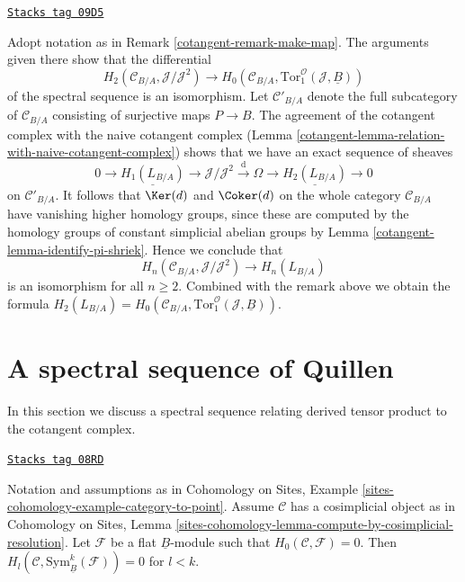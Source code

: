\begin{remark}[Surjection]
\label{cotangent-remark-surjection}
\href{https://stacks.math.columbia.edu/tag/09D5}{\texttt{Stacks tag 09D5}}

Adopt notation as in Remark \ref{cotangent-remark-make-map}. The arguments given
there show that the differential
$$
H_2(\mathcal{C}_{B/A}, \mathcal{J}/\mathcal{J}^2)
\longrightarrow
H_0(\mathcal{C}_{B/A}, \text{Tor}_1^\mathcal{O}(\mathcal{J}, \underline{B}))
$$
of the spectral sequence is an isomorphism. Let $\mathcal{C}'_{B/A}$
denote the full subcategory of $\mathcal{C}_{B/A}$ consisting of surjective
maps $P \to B$. The agreement of the cotangent complex with the naive
cotangent complex (Lemma \ref{cotangent-lemma-relation-with-naive-cotangent-complex})
shows that we have an exact sequence of sheaves
$$
0 \to \underline{H_1(L_{B/A})} \to
\mathcal{J}/\mathcal{J}^2 \xrightarrow{\text{d}} \Omega \to
\underline{H_2(L_{B/A})} \to 0
$$
on $\mathcal{C}'_{B/A}$. It follows that $\Ker(d)$ and
$\Coker(d)$ on the whole category $\mathcal{C}_{B/A}$ have
vanishing higher homology groups, since
these are computed by the homology groups of constant simplicial abelian
groups by Lemma \ref{cotangent-lemma-identify-pi-shriek}. Hence we conclude
that
$$
H_n(\mathcal{C}_{B/A}, \mathcal{J}/\mathcal{J}^2) \to H_n(L_{B/A})
$$
is an isomorphism for all $n \geq 2$. Combined with the remark above
we obtain the formula
$H_2(L_{B/A}) =
H_0(\mathcal{C}_{B/A}, \text{Tor}_1^\mathcal{O}(\mathcal{J}, \underline{B}))$.
\end{remark}

\section{A spectral sequence of Quillen}
\label{cotangent-section-spectral-sequence}
In this section we discuss a spectral sequence relating derived
tensor product to the cotangent complex.

\begin{lemma}
\label{cotangent-lemma-vanishing-symmetric-powers}
\href{https://stacks.math.columbia.edu/tag/08RD}{\texttt{Stacks tag 08RD}}

Notation and assumptions as in
Cohomology on Sites, Example \ref{sites-cohomology-example-category-to-point}.
Assume $\mathcal{C}$ has a cosimplicial object as in
Cohomology on Sites, Lemma
\ref{sites-cohomology-lemma-compute-by-cosimplicial-resolution}.
Let $\mathcal{F}$ be a flat $\underline{B}$-module such that
$H_0(\mathcal{C}, \mathcal{F}) = 0$.
Then $H_l(\mathcal{C}, \text{Sym}_{\underline{B}}^k(\mathcal{F})) = 0$
for $l < k$.
\end{lemma}

